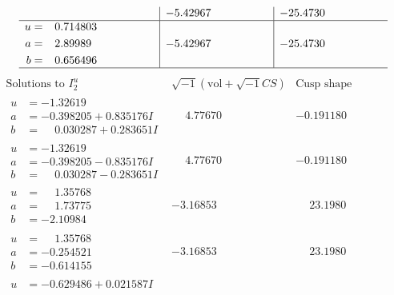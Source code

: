 \documentclass[1p]{elsarticle_modified}
\theoremstyle{definition}
\newcommand{\I}{\sqrt{-1}}
\begin{document}
$$\begin{array}{c|c|c}
 & -5.42967\phantom{ +0.000000I} & -25.4730\phantom{ +0.000000I} \\ \hline\begin{aligned}
u &= \phantom{-}0.714803\phantom{ +0.000000I} \\
a &= \phantom{-}2.89989\phantom{ +0.000000I} \\
b &= \phantom{-}0.656496\phantom{ +0.000000I}\end{aligned}
 & -5.42967\phantom{ +0.000000I} & -25.4730\phantom{ +0.000000I}\\
 \hline 
 \end{array}$$\newpage$$\begin{array}{c|c|c}  
\text{Solutions to }I^u_{2}& \I (\text{vol} + \sqrt{-1}CS) & \text{Cusp shape}\\
 \hline 
\begin{aligned}
u &= -1.32619\phantom{ +0.000000I} \\
a &= -0.398205 + 0.835176 I \\
b &= \phantom{-}0.030287 + 0.283651 I\end{aligned}
 & \phantom{-}4.77670\phantom{ +0.000000I} & -0.191180\phantom{ +0.000000I} \\ \hline\begin{aligned}
u &= -1.32619\phantom{ +0.000000I} \\
a &= -0.398205 - 0.835176 I \\
b &= \phantom{-}0.030287 - 0.283651 I\end{aligned}
 & \phantom{-}4.77670\phantom{ +0.000000I} & -0.191180\phantom{ +0.000000I} \\ \hline\begin{aligned}
u &= \phantom{-}1.35768\phantom{ +0.000000I} \\
a &= \phantom{-}1.73775\phantom{ +0.000000I} \\
b &= -2.10984\phantom{ +0.000000I}\end{aligned}
 & -3.16853\phantom{ +0.000000I} & \phantom{-}23.1980\phantom{ +0.000000I} \\ \hline\begin{aligned}
u &= \phantom{-}1.35768\phantom{ +0.000000I} \\
a &= -0.254521\phantom{ +0.000000I} \\
b &= -0.614155\phantom{ +0.000000I}\end{aligned}
 & -3.16853\phantom{ +0.000000I} & \phantom{-}23.1980\phantom{ +0.000000I} \\ \hline\begin{aligned}
u &= -0.629486 + 0.021587 I \\

\end{aligned}
\end{array}$$
\end{document}
